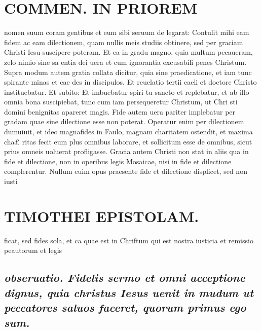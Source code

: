 \documentclass{article}
\begin{document}
\begin{pages}
\section*{COMMEN. IN PRIOREM }
\marginpar{[ p.30 ]}\pstart nomen suum coram gentibus et eum sibi seruum de legarat: Contulit mihi eam fidem ac eam dilectionem, quam nullis meis studiis obtinere, sed per graciam Christi Iesu suscipere poteram. Et ea in gradu magno, quia multum pecaueram, zelo nimio sine sa entia dei uera et cum ignorantia excusabili penes Christum.  \pend\pstart Supra modum autem gratia collata dicitur, quia sine praedicatione, et iam tunc spirante minas et cae des in discipulos. Et reuelatio tertii caeli et doctore Christo instituebatur. Et subito: Et imbuebatur spiri tu sancto et replebatur, et ab illo omnia bona suscipiebat, tunc cum iam persequeretur Christum, ut Chri sti domini benignitas apareret magis.  \pend\pstart Fide autem uera pariter implebatur per gradam quae sine dilectione esse non poterat. Operatur enim per dilectionem dumuiuit, et ideo magnafides in Faulo, magnam charitatem ostendit, et maxima cha£ ritas fecit eum plus omnibus laborare, et sollicitum esse de omnibus, sicut prius omneis uoluerat profligasse.  \pend\pstart Gracia autem Christi non stat in aliis qua in fide et dilectione, non in operibus legis Mosaicae, nisi in fide et dilectione complerentur. Nullum euim opus praesente fide et dilectione displicet, sed non iusti\pend
\section*{TIMOTHEI EPISTOLAM. }
\marginpar{[ p.31 ]}\pstart ficat, sed fides sola, et ca quae est in Chriftum qui est nostra iusticia et remissio peautorum et legis  \pend
{}
{}
\subsection*{\textit{obseruatio. Fidelis sermo et omni acceptione dignus, quia christus Iesus uenit in mudum ut peccatores saluos faceret, quorum primus ego sum. }}
{}

\end{pages}
\end{document}
